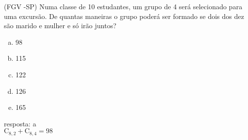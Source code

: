 \begin{ex}
(FGV -SP) Numa classe de 10 estudantes, um grupo de 4 será selecionado para uma excursão. De quantas maneiras o grupo poderá ser formado se dois dos dez  são marido e mulher e só irão juntos?
    \begin{enumerate}[(a)]
    \item 98
    \item 115
    \item 122
    \item 126
    \item 165
    \end{enumerate}
      \begin{sol}
        resposta: a \\
        $\mathrm{C}_{8,2}+\mathrm{C}_{8,4}=98$
      \end{sol}
\end{ex}
